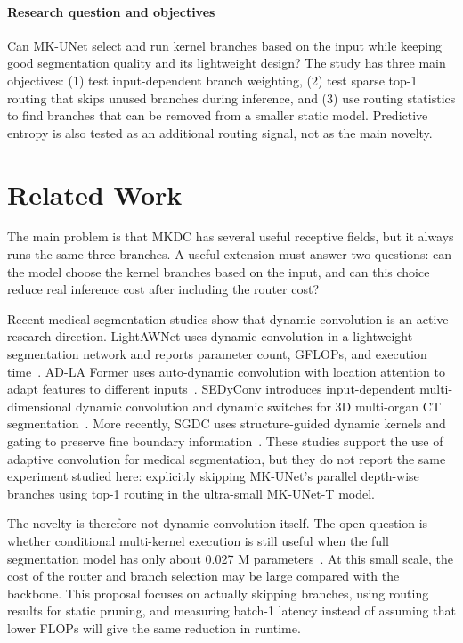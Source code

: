 \documentclass[10pt,a4paper]{article}
\begin{document}
\paragraph{Research question and objectives} Can MK-UNet select and run kernel branches based on the input while keeping good segmentation quality and its lightweight design? The study has three main objectives: (1) test input-dependent branch weighting, (2) test sparse top-1 routing that skips unused branches during inference, and (3) use routing statistics to find branches that can be removed from a smaller static model. Predictive entropy is also tested as an additional routing signal, not as the main novelty.

\section{Related Work}

The main problem is that MKDC has several useful receptive fields, but it always runs the same three branches. A useful extension must answer two questions: can the model choose the kernel branches based on the input, and can this choice reduce real inference cost after including the router cost?

Recent medical segmentation studies show that dynamic convolution is an active research direction. LightAWNet uses dynamic convolution in a lightweight segmentation network and reports parameter count, GFLOPs, and execution time~\cite{wang2025lightawnet}. AD-LA Former uses auto-dynamic convolution with location attention to adapt features to different inputs~\cite{wang2025adlaformer}. SEDyConv introduces input-dependent multi-dimensional dynamic convolution and dynamic switches for 3D multi-organ CT segmentation~\cite{hao2025sedyconv}. More recently, SGDC uses structure-guided dynamic kernels and gating to preserve fine boundary information~\cite{shi2026sgdc}. These studies support the use of adaptive convolution for medical segmentation, but they do not report the same experiment studied here: explicitly skipping MK-UNet's parallel depth-wise branches using top-1 routing in the ultra-small MK-UNet-T model.

The novelty is therefore not dynamic convolution itself. The open question is whether conditional multi-kernel execution is still useful when the full segmentation model has only about 0.027 M parameters~\cite{rahman2025mkunet}. At this small scale, the cost of the router and branch selection may be large compared with the backbone. This proposal focuses on actually skipping branches, using routing results for static pruning, and measuring batch-1 latency instead of assuming that lower FLOPs will give the same reduction in runtime.
\end{document}
